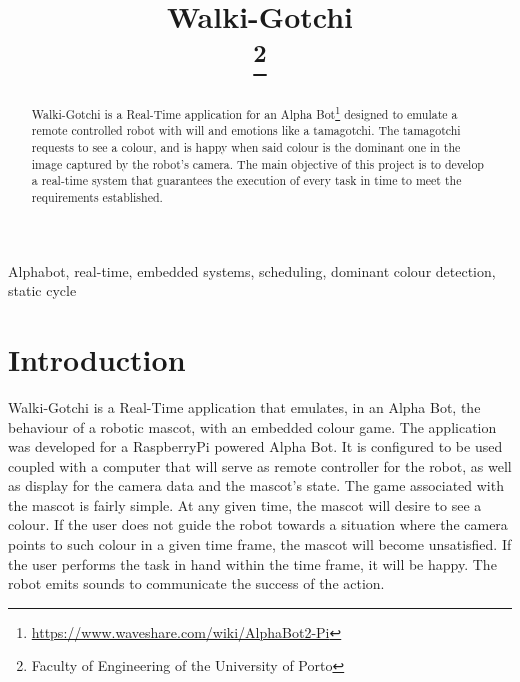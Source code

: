 \documentclass[conference]{IEEEtran}
\begin{document}
\title{Walki-Gotchi\\

\thanks{Faculty of Engineering of the University of Porto}
}

\author{
\and
{}
\and
{}
}

\maketitle

\begin{abstract}
Walki-Gotchi is a Real-Time application for an Alpha Bot\footnote{\url{https://www.waveshare.com/wiki/AlphaBot2-Pi}} designed to emulate a remote controlled robot with will and emotions like a tamagotchi. The tamagotchi requests to see a colour, and is happy when said colour is the dominant one in the image captured by the robot's camera. The main objective of this project is to develop a real-time system that guarantees the execution of every task in time to meet the requirements established.
\end{abstract}

\begin{IEEEkeywords}
Alphabot, real-time, embedded systems, scheduling, dominant colour detection, static cycle
\end{IEEEkeywords}

\section{Introduction}
Walki-Gotchi is a Real-Time application that emulates, in an Alpha Bot, the behaviour of a robotic mascot, with an embedded colour game. The application was developed for a RaspberryPi powered Alpha Bot. It is configured to be used coupled with a computer that will serve as remote controller for the robot, as well as display for the camera data and the mascot's state. The game associated with the mascot is fairly simple. At any given time, the mascot will desire to see a colour. If the user does not guide the robot towards a situation where the camera points to such colour in a given time frame, the mascot will become unsatisfied. If the user performs the task in hand within the time frame, it will be happy. The robot emits sounds to communicate the success of the action. 
\end{document}
